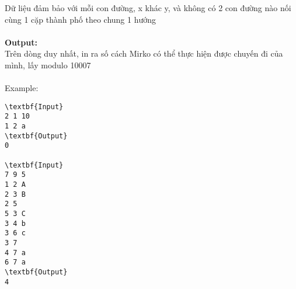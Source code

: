 Dữ liệu đảm bảo với mỗi con đường, x khác y, và không có 2 con đường nào nối cùng 1 cặp thành phố theo chung 1 hướng
\\
\\\textbf{Output:}
\\Trên dòng duy nhất, in ra số cách Mirko có thể thực hiện được chuyến đi của mình, lấy modulo 10007
\\
\\Example:
\begin{verbatim}
\textbf{Input}
2 1 10
1 2 a
\textbf{Output}
0

\textbf{Input}
7 9 5
1 2 A
2 3 B
2 5
5 3 C
3 4 b
3 6 c
3 7
4 7 a
6 7 a
\textbf{Output}
4\end{verbatim}
